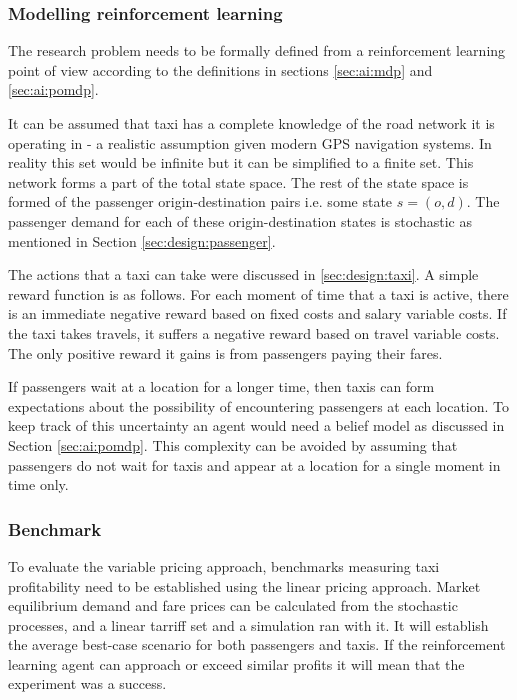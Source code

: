 \subsubsection{Modelling reinforcement learning}
\label{sec:design:ai}

The research problem needs to be formally defined from a reinforcement learning
point of view according to the definitions in sections \ref{sec:ai:mdp} and
\ref{sec:ai:pomdp}.

It can be assumed that taxi has a complete knowledge of the road network it is
operating in - a realistic assumption given modern GPS navigation systems. In
reality this set would be infinite but it can be simplified to a finite set.
This network forms a part of the total state space. The rest of the state space
is formed of the passenger origin-destination pairs i.e. some state \(s = (o,
d) \). The passenger demand for each of these origin-destination states is
stochastic as mentioned in Section \ref{sec:design:passenger}. 

The actions that a taxi can take were discussed in \ref{sec:design:taxi}. A
simple reward function is as follows. For each moment of time that a taxi is
active, there is an immediate negative reward based on fixed costs and salary
variable costs. If the taxi takes travels, it suffers a negative reward based
on travel variable costs. The only positive reward it gains is from passengers
paying their fares.

If passengers wait at a location for a longer time, then taxis can form
expectations about the possibility of encountering passengers at each location.
To keep track of this uncertainty an agent would need a belief model as
discussed in Section \ref{sec:ai:pomdp}. This complexity can be avoided by
assuming that passengers do not wait for taxis and appear at a location for a
single moment in time only.

\subsubsection{Benchmark} 

To evaluate the variable pricing approach, benchmarks measuring taxi
profitability need to be established using the linear pricing approach. Market
equilibrium demand and fare prices can be calculated from the stochastic
processes, and a linear tarriff set and a simulation ran with it. It will
establish the average best-case scenario for both passengers and taxis. If the
reinforcement learning agent can approach or exceed similar profits it will
mean that the experiment was a success. 

